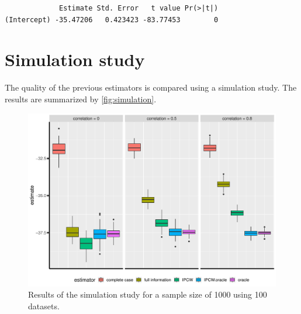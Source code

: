 \documentclass[12pt]{article}
\begin{document}
\begin{verbatim}
             Estimate Std. Error   t value Pr(>|t|)
(Intercept) -35.47206   0.423423 -83.77453        0
\end{verbatim}


\clearpage

\section{Simulation study}
\label{sec:orgac4b2ea}

The quality of the previous estimators is compared using a simulation
study. The results are summarized by \autoref{fig:simulation}.

\begin{figure}[!h]
\centering
\includegraphics[width=\textwidth]{./figures/simStudy-bias.pdf}
\caption{\label{fig:simulation}Results of the simulation study for a sample size of 1000 using 100 datasets.}
\end{figure}
\end{document}
